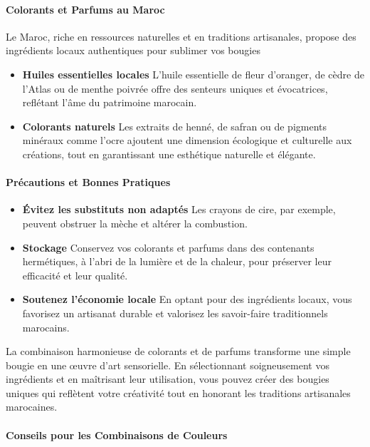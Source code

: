 \documentclass[11pt,fleqn,onecolumn,oneside]{book}
\begin{document}
\paragraph{Colorants et Parfums au Maroc}

Le Maroc, riche en ressources naturelles et en traditions artisanales, propose des ingrédients locaux authentiques pour sublimer vos bougies
\begin{itemize}
    \item \textbf{Huiles essentielles locales} L’huile essentielle de fleur d’oranger, de cèdre de l’Atlas ou de menthe poivrée offre des senteurs uniques et évocatrices, reflétant l’âme du patrimoine marocain.
    \item \textbf{Colorants naturels} Les extraits de henné, de safran ou de pigments minéraux comme l’ocre ajoutent une dimension écologique et culturelle aux créations, tout en garantissant une esthétique naturelle et élégante.
\end{itemize}

\paragraph{Précautions et Bonnes Pratiques}
\begin{itemize}
    \item \textbf{Évitez les substituts non adaptés} Les crayons de cire, par exemple, peuvent obstruer la mèche et altérer la combustion.
    \item \textbf{Stockage} Conservez vos colorants et parfums dans des contenants hermétiques, à l’abri de la lumière et de la chaleur, pour préserver leur efficacité et leur qualité.
    \item \textbf{Soutenez l’économie locale} En optant pour des ingrédients locaux, vous favorisez un artisanat durable et valorisez les savoir-faire traditionnels marocains.
\end{itemize}

\begin{corollary}
La combinaison harmonieuse de colorants et de parfums transforme une simple bougie en une œuvre d’art sensorielle. En sélectionnant soigneusement vos ingrédients et en maîtrisant leur utilisation, vous pouvez créer des bougies uniques qui reflètent votre créativité tout en honorant les traditions artisanales marocaines.
\end{corollary}



\paragraph{Conseils pour les Combinaisons de Couleurs}
\end{document}
